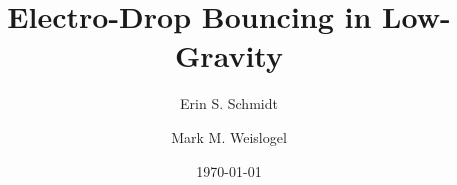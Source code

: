 \documentclass[aip,reprint, floatfix]{revtex4-1}
\begin{document}
\newcommand{\redline}{\raisebox{2pt}{\tikz{\draw[-,red,solid,line width = 1.5pt](0,0) -- (5mm,0);}}}
\graphicspath{ {../figures/} }


\title{Electro-Drop Bouncing in Low-Gravity} %



\author{Erin S. Schmidt}

\author{Mark M. Weislogel}


\date{\today}
\end{document}
